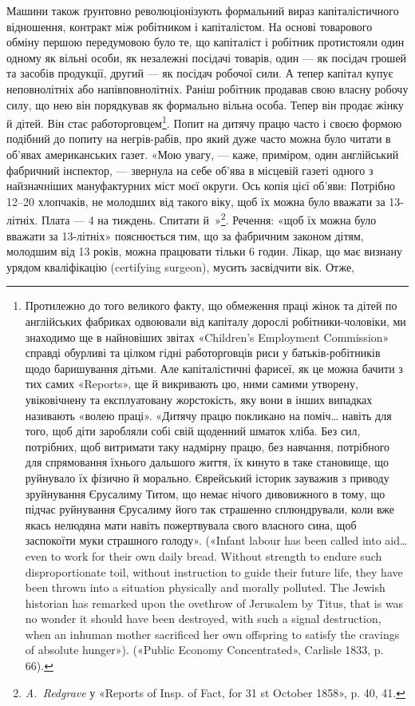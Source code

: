 Машини також ґрунтовно революціонізують формальний вираз
капіталістичного відношення, контракт між робітником і капіталістом.
На основі товарового обміну першою передумовою було
те, що капіталіст і робітник протистояли один одному як вільні
особи, як незалежні посідачі товарів, один — як посідач грошей
та засобів продукції, другий — як посідач робочої сили. А тепер
капітал купує неповнолітніх або напівповнолітніх. Раніш
робітник продавав свою власну робочу силу, що нею він порядкував
як формально вільна особа. Тепер він продає жінку
й дітей. Він стає работорговцем\footnote{
Протилежно до того великого факту, що обмеження праці жінок
та дітей по англійських фабриках одвоювали від капіталу дорослі робітники-чоловіки,
ми знаходимо ще в найновіших звітах «Children’s Employment
Commission» справді обурливі та цілком гідні работорговців риси
у батьків-робітників щодо баришування дітьми. Але капіталістичні
фарисеї, як це можна бачити з тих самих «Reports», ще й викривають цю,
ними самими утворену, увіковічнену та експлуатовану жорстокість, яку
вони в інших випадках називають «волею праці». «Дитячу працю покликано
на поміч\dots{} навіть для того, щоб діти заробляли собі свій щоденний
шматок хліба. Без сил, потрібних, щоб витримати таку надмірну
працю, без навчання, потрібного для спрямовання їхнього дальшого життя,
їх кинуто в таке становище, що руйнувало їх фізично й морально. Єврейський
історик зауважив з приводу зруйнування Єрусалиму Титом, що
немає нічого дивовижного в тому, що підчас руйнування Єрусалиму його
так страшенно сплюндрували, коли вже якась нелюдяна мати навіть пожертвувала
свого власного сина, щоб заспокоїти муки страшного голоду».
(«Infant labour has been called into aid\dots{} even to work for their own daily
bread. Without strength to endure such disproportionate toil, without
instruction to guide their future life, they have been thrown into a situation
physically and morally polluted. The Jewish historian has remarked upon
the ovethrow of Jerusalem by Titus, that is was no wonder it should have
been destroyed, with such a signal destruction, when an inhuman mother
sacrificed her own offspring to satisfy the cravings of absolute hunger»).
(«Public Economy Concentrated», Carlisle 1833, p. 66).
}. Попит на дитячу працю
часто і своєю формою подібний до попиту на негрів-рабів,
про який дуже часто можна було читати в об’явах американських
газет. «Мою увагу, — каже, приміром, один англійський
фабричний інспектор, — звернула на себе об’ява в місцевій
газеті одного з найзначніших мануфактурних міст моєї округи.
Ось копія цієї об’яви: Потрібно 12--20 хлопчаків, не молодших
від такого віку, щоб їх можна було вважати за 13-літніх.
Плата — 4 на тиждень. Спитати й~»\footnote{
 \emph{A.~Redgrave} у «Reports of Insp. of Fact, for 31 st October
1858», p. 40, 41.
}. Речення:
«щоб їх можна було вважати за 13-літніх» пояснюється тим, що
за фабричним законом дітям, молодшим від 13 років, можна
працювати тільки 6 годин. Лікар, що має визнану урядом кваліфікацію
(certifying surgeon), мусить засвідчити вік. Отже,
\parbreak{}  %
